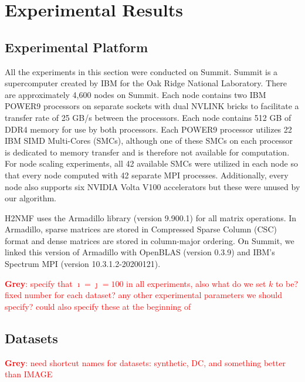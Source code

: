 \documentclass[conference,compsoc]{IEEEtran}
\newcommand{\GB}[1]{\textcolor{red}{\textbf{Grey}: #1}}
\begin{document}
\section{Experimental Results}

\subsection{Experimental Platform}
All the experiments in this section were conducted on Summit. Summit is a supercomputer created by IBM for the Oak Ridge National Laboratory. 
There are approximately 4,600 nodes on Summit. Each node contains two IBM POWER9 processors on separate sockets with dual NVLINK bricks to facilitate a transfer rate of 
25 GB/s between the processors. Each node contains 512 GB of DDR4 memory for use by both processors. Each POWER9 processor utilizes 22 IBM SIMD Multi-Cores (SMCs), 
although one of these SMCs on each processor is dedicated to memory transfer and is therefore not available for computation. 
For node scaling experiments, all 42 available SMCs were utilized in each node so that every node computed with 42 separate MPI processes.
Additionally, every node also supports six NVIDIA Volta V100 accelerators but these were unused by our algorithm. 

H2NMF uses the Armadillo library (version 9.900.1) for all matrix operations. 
In Armadillo, sparse matrices are stored in Compressed Sparse Column (CSC) format and dense matrices are stored in column-major ordering.
On Summit, we linked this version of Armadillo with OpenBLAS (version 0.3.9) and IBM's Spectrum MPI (version 10.3.1.2-20200121).


\GB{specify that $\imath=\jmath=100$ in all experiments, also what do we set $k$ to be?  fixed number for each dataset?  any other experimental parameters we should specify? could also specify these at the beginning of \Cref{sec:perf}}


\subsection{Datasets}

\GB{need shortcut names for datasets: synthetic, DC, and something better than IMAGE}
\end{document}

